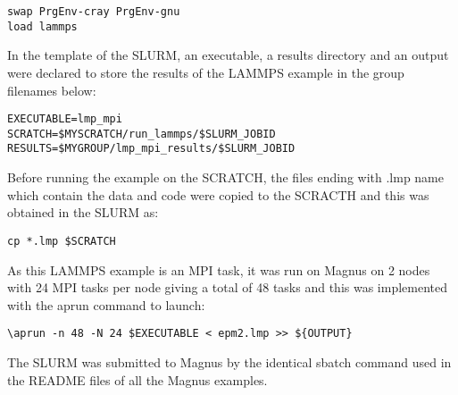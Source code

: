 \begin{tcolorbox}
\begin{verbatim}
swap PrgEnv-cray PrgEnv-gnu
load lammps
\end{verbatim}
\end{tcolorbox}

In the template of the SLURM, an executable, a results directory and an output were declared to store the results of the LAMMPS example in the group filenames below:

\begin{tcolorbox}
\begin{Verbatim}[fontsize=\scriptsize]
EXECUTABLE=lmp_mpi
SCRATCH=$MYSCRATCH/run_lammps/$SLURM_JOBID
RESULTS=$MYGROUP/lmp_mpi_results/$SLURM_JOBID
\end{Verbatim}
\end{tcolorbox}

Before running the example on the SCRATCH, the files ending with .lmp name which contain the data and code were copied to the SCRACTH and this was
obtained in the SLURM as:

\begin{tcolorbox}
\begin{verbatim}
cp *.lmp $SCRATCH
\end{verbatim}
\end{tcolorbox}

As this LAMMPS example is an MPI task, it was run on Magnus on 2 nodes with 24 MPI tasks per node giving a total of 48 tasks and this was implemented
with the aprun command to launch:

\begin{tcolorbox}
\begin{Verbatim}[fontsize=\scriptsize]
\aprun -n 48 -N 24 $EXECUTABLE < epm2.lmp >> ${OUTPUT}
\end{Verbatim}
\end{tcolorbox}


The SLURM was submitted to Magnus by the identical sbatch command used in the README files of all the Magnus examples.

